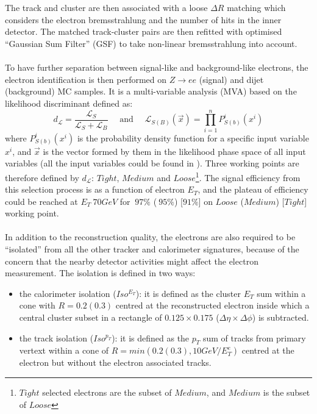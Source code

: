 \\
\\The track and cluster are then associated with a loose $\Delta R$ matching which considers the electron bremsstrahlung and the number of hits in the inner detector. The matched track-cluster pairs are then refitted with optimised ``Gaussian Sum Filter'' (GSF) to take non-linear bremsstrahlung into account. 
\\
\\To have further separation between signal-like and background-like electrons, the electron identification is then performed on $Z \rightarrow ee$ (signal) and dijet (background) MC samples. It is a multi-variable analysis (MVA) based on the likelihood discriminant defined as:
\\
\begin{equation}
d_{\mathcal{L}}=\frac{\mathcal{L}_{S}}{\mathcal{L}_{S}+\mathcal{L}_{B}}    
\quad \text{ and } \quad
\mathcal{L}_{S(B)}(\vec{x})=\prod_{i = 1}^{n}P^{i}_{S(b)}(x^{i})
\end{equation}
where $P^{i}_{S(b)}(x^{i})$ is the probability density function for a specific input variable $x^{i}$, and $\vec{x}$ is the vector formed by them in the likelihood phase space of all input variables (all the input variables could be found in \cite{}). Three working points are therefore defined by $d_{\mathcal{L}}$: $Tight$, $Medium$ and $Loose$\footnote{$Tight$ selected electrons are the subset of $Medium$, and $Medium$ is the subset of $Loose$}. The signal efficiency from this selection process is as a function of electron $E_{T}$, and the plateau of efficiency could be reached at $E_{T}~70GeV$ for $~97\%$ ($~95\%$) [$91\%$] on $Loose$ ($Medium$) [$Tight$] working point. 
\\
\\In addition to the reconstruction quality, the electrons are also required to be ``isolated'' from all the other tracker and calorimeter signatures, because of the concern that the nearby detector activities might affect the electron measurement. The isolation is defined in two ways: 
\begin{itemize}
	\item the calorimeter isolation ($Iso^{E_{T}}$): it is defined as the cluster $E_{T}$ sum within a cone with $R=0.2(0.3)$ centred at the reconstructed electron inside which a central cluster subset in a rectangle of $0.125 \times 0.175$ ($\Delta \eta \times \Delta \phi$) is subtracted.
	\item the track isolation ($Iso^{p_{T}}$): it is defined as the $p_{T}$ sum of tracks from primary vertext within a cone of $R=min(0.2(0.3), 10GeV/E^{e}_{T})$ centred at the electron but without the electron associated tracks.  
\end{itemize}
